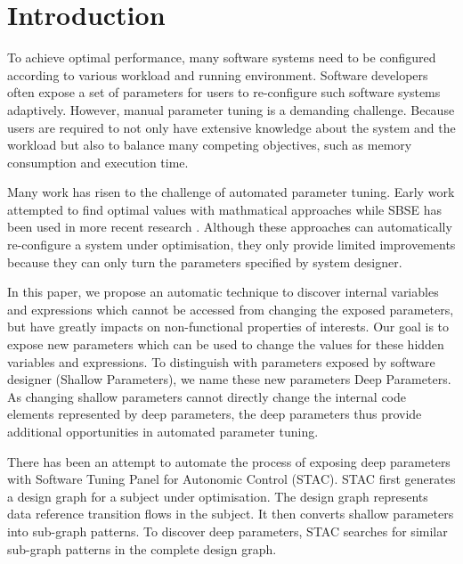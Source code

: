
\section{Introduction}

To achieve optimal performance, many software systems need to be configured according to various workload and running environment. 
Software developers often expose a set of parameters for users to re-configure such software systems adaptively.
However, manual parameter tuning is a demanding challenge. Because users are required to not only have extensive knowledge about the system and the workload but also to balance many competing objectives, such as memory consumption and execution time.

Many work has risen to the challenge of automated parameter tuning\cite{Hoffmann:2011:DKR:1961296.1950390}. Early work attempted to find optimal values with mathmatical approaches \cite{Vuduc01statisticalmodels,autotuning,Whaley:1998:ATL:509058.509096,Tapus:2002:AHT:762761.762771} while SBSE\cite{Harman:2007:CSF:1253532.1254729} has been used in more recent research \cite{hutter2009paramils,arcuri-ssbse-2011,Hoffmann:2011:DKR:1961296.1950390}. Although these approaches can automatically re-configure a system under optimisation, they only provide limited improvements because they can only turn the parameters specified by system designer.

In this paper, we propose an automatic technique to discover internal variables and expressions which cannot be accessed from changing the exposed parameters, but have greatly impacts on non-functional properties of interests. Our goal is to expose new parameters which can be used to change the values for these hidden variables and expressions. To distinguish with parameters exposed by software designer (Shallow Parameters), we name these new parameters Deep Parameters. As changing shallow parameters cannot directly change the internal code elements represented by deep parameters, the deep parameters thus provide additional opportunities in automated parameter tuning.

There has been an attempt to automate the process of exposing deep parameters with Software Tuning Panel for Autonomic Control (STAC)\cite{Brake:2008:ADS:1370018.1370031}. STAC first generates a design graph for a subject under optimisation. The design graph represents data reference transition flows in the subject. It then converts shallow parameters into sub-graph patterns. To discover deep parameters, STAC searches for similar sub-graph patterns in the complete design graph. 

